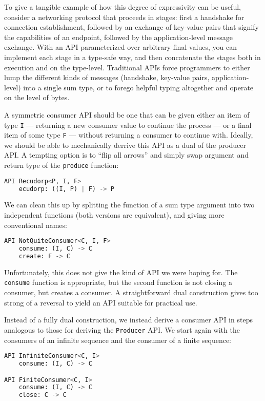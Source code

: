 \documentclass[sigplan,screen,10pt,anonymous,review]{acmart}
\begin{document}
To give a tangible example of how this degree of expressivity can be useful, consider a networking protocol that proceeds in stages: first a handshake for connection establishment, followed by an exchange of key-value pairs that signify the capabilities of an endpoint, followed by the application-level message exchange. With an API parameterized over arbitrary final values, you can implement each stage in a type-safe way, and then concatenate the stages both in execution and on the type-level. Traditional APIs force programmers to either lump the different kinds of messages (handshake, key-value pairs, application-level) into a single sum type, or to forego helpful typing altogether and operate on the level of bytes.

A symmetric consumer API should be one that can be given either an item of type \texttt{I} --- returning a new consumer value to continue the process --- or a final item of some type \texttt{F} --- without returning a consumer to continue with. Ideally, we should be able to mechanically derrive this API as a dual of the producer API. A tempting option is to ``flip all arrows'' and simply swap argument and return type of the \texttt{produce} function:

\begin{lstlisting}[language=Python]
API Recudorp<P, I, F>
    ecudorp: ((I, P) | F) -> P
\end{lstlisting}

We can clean this up by splitting the function of a sum type argument into two independent functions (both versions are equivalent), and giving more conventional names:

\begin{lstlisting}[language=Python]
API NotQuiteConsumer<C, I, F>
    consume: (I, C) -> C
    create: F -> C
\end{lstlisting}

Unfortunately, this does not give the kind of API we were hoping for. The \texttt{consume} function is appropriate, but the second function is not closing a consumer, but creates a consumer. A straightforward dual construction gives too strong of a reversal to yield an API suitable for practical use.

Instead of a fully dual construction, we instead derive a consumer API in steps analogous to those for deriving the \texttt{Producer} API. We start again with the consumers of an infinite sequence and the consumer of a finite sequence:

\begin{lstlisting}[language=Python]
API InfiniteConsumer<C, I>
    consume: (I, C) -> C

API FiniteConsumer<C, I>
    consume: (I, C) -> C
    close: C -> C
\end{lstlisting}
\end{document}
